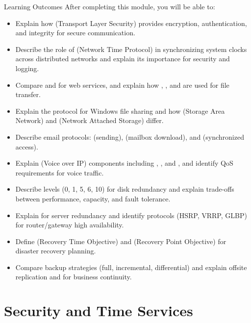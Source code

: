 \documentclass[aspectratio=169]{beamer}  %
\begin{document}
\begin{frame}[t,allowframebreaks]{Learning Outcomes}
    After completing this module, you will be able to:
    \vspace{0.5em}
    \small
    \begin{itemize}
        \item Explain how  (Transport Layer Security) provides encryption, authentication, and integrity for secure communication.
        \item Describe the role of  (Network Time Protocol) in synchronizing system clocks across distributed networks and explain its importance for security and logging.
        \item Compare  and  for web services, and explain how , , and  are used for file transfer.
        \item Explain the  protocol for Windows file sharing and how  (Storage Area Network) and  (Network Attached Storage) differ.
        \item Describe email protocols:  (sending),  (mailbox download), and  (synchronized access).
        \item Explain  (Voice over IP) components including , , and , and identify QoS requirements for voice traffic.
        \item Describe  levels (0, 1, 5, 6, 10) for disk redundancy and explain trade-offs between performance, capacity, and fault tolerance.
        \item Explain  for server redundancy and identify  protocols (HSRP, VRRP, GLBP) for router/gateway high availability.
        \item Define  (Recovery Time Objective) and  (Recovery Point Objective) for disaster recovery planning.
        \item Compare backup strategies (full, incremental, differential) and explain offsite replication and  for business continuity.
    \end{itemize}
\end{frame}

\section{Security and Time Services}
\end{document}

